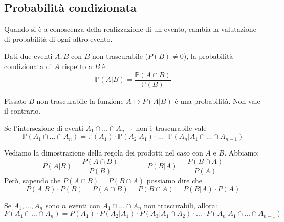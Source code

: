 \subsection{Probabilità condizionata}
Quando si è a conoscenza della realizzazione di un evento, cambia la valutazione di probabilità di ogni altro evento.
\begin{definition}
	Dati due eventi $A, B$ con $B$ non trascurabile ($P(B) \neq 0$), la probabilità condizionata di $A$ rispetto a $B$ è
	\begin{equation}
		\mathbb{P}(A \vert B) = \frac{\mathbb{P}(A \cap B)}{\mathbb{P}(B)}
	\end{equation}
\end{definition}

\begin{observation}
	Fissato $B$ non trascurabile la funzione $A \mapsto P(A\vert B)$ è una probabilità. Non vale il contrario.
\end{observation}

\begin{proposition}
	Se l'intersezione di eventi $A_1 \cap \ldots \cap A_{n-1}$ non è trascurabile vale
	\begin{equation}
		\mathbb{P}(A_1 \cap \ldots \cap A_n) = \mathbb{P} (A_1) \cdot \mathbb{P}(A_2 \vert A_1) \cdot \ldots \cdot \mathbb{P}(A_n \vert A_1 \cap \ldots \cap A_{n-1})
	\end{equation}
\end{proposition}

\begin{demostration}
	Vediamo la dimostrazione della regola dei prodotti nel caso con $A$ e $B$. Abbiamo:
	\begin{equation*}
		P(A\vert B)=\frac{P(A \cap B)}{P(B)} \qquad \qquad P(B\vert A)=\frac{P(B\cap A)}{P(A)}
	\end{equation*}
	Però, sapendo che $P(A\cap B) = P(B \cap A) $ possiamo dire che
	\begin{equation*}
		P(A \vert B) \cdot P(B) = P(A\cap B) = P(B\cap A) = P(B \vert A) \cdot P(A)
	\end{equation*}
\end{demostration}

\begin{definition}
	Se $A_1, \ldots, A_n$ sono $n$ eventi con $A_1 \cap \ldots \cap A_n$ non trascurabili, allora:
	\begin{equation}
		P(A_1 \cap \ldots \cap A_n)=P(A_1) \cdot P(A_2 \vert A_1) \cdot P(A_3 \vert A_1 \cap A_2) \cdot \ldots \cdot P(A_n \vert A_1 \cap \ldots \cap A_{n-1})
	\end{equation}
\end{definition}

